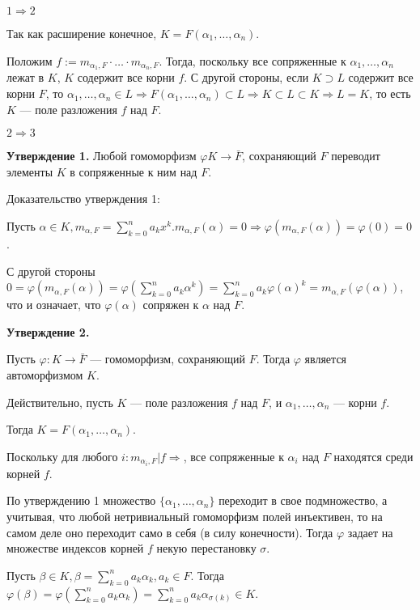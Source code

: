 \begin{solution}
\(1 \Rightarrow 2\)

Так как расширение конечное, \(K = F(\alpha_1, \ldots, \alpha_n)\).

Положим \(f := m_{\alpha_1, F} \cdot \ldots \cdot m_{\alpha_n, F}\). Тогда, поскольку все сопряженные к \(\alpha_1, \ldots, \alpha_n\) лежат в \(K\), \(K\) содержит все корни \(f\). С другой стороны, если \(K \supset L\) содержит все корни \(F\), то \(\alpha_1, \ldots, \alpha_n \in L \Rightarrow F(\alpha_1, \ldots, \alpha_n) \subset L \Rightarrow K \subset L \subset K \Rightarrow L = K\), то есть \(K\) --- поле разложения \(f\) над \(F\).

\(2 \Rightarrow 3\)

\textbf{Утверждение 1.} Любой гомоморфизм \(\varphi K \to \bar{F}\), сохраняющий \(F\) переводит элементы \(K\) в сопряженные к ним над \(F\).

Доказательство утверждения 1:

Пусть \(\alpha \in K, m_{\alpha, F} = \sum\limits_{k=0}^n a_kx^k. m_{\alpha, F}(\alpha) = 0 \Rightarrow \varphi(m_{\alpha, F}(\alpha)) = \varphi(0) = 0\).

С другой стороны \(0 = \varphi(m_{\alpha, F}(\alpha)) = \varphi(\sum\limits_{k=0}^n a_k \alpha^k) = \sum\limits_{k=0}^n a_k \varphi(\alpha)^k = m_{\alpha, F}(\varphi(\alpha))\),
что и означает, что \(\varphi(\alpha)\) сопряжен к \(\alpha\) над \(F\).

\hypertarget{9.1.statement.2}{\textbf{Утверждение 2.}}
Пусть \(\varphi: K \to \bar{F}\) --- гомоморфизм, сохраняющий \(F\). Тогда \(\varphi\) является автоморфизмом \(K\).

Действительно, пусть \(K\) --- поле разложения \(f\) над \(F\), и
\(\alpha_1, \ldots, \alpha_n\) --- корни \(f\).

Тогда \(K = F(\alpha_1, \ldots, \alpha_n)\).

Поскольку для любого \(i: m_{\alpha_i, F} | f \Rightarrow\), все сопряженные к \(\alpha_i\) над \(F\) находятся среди корней \(f\).

По утверждению 1 множество \(\{\alpha_1, \ldots, \alpha_n\}\) переходит в свое подмножество, а учитывая, что любой нетривиальный гомоморфизм полей инъективен, то на самом деле оно переходит само в себя (в силу конечности). Тогда \(\varphi\) задает на множестве индексов корней \(f\) некую перестановку \(\sigma\).

Пусть \(\beta \in K, \beta = \sum\limits_{k=0}^n a_k \alpha_k, a_k \in F\). Тогда \(\varphi(\beta) = \varphi(\sum\limits_{k=0}^n a_k \alpha_k) = \sum\limits_{k=0}^n a_k \alpha_{\sigma(k)} \in K\).


\end{solution}
